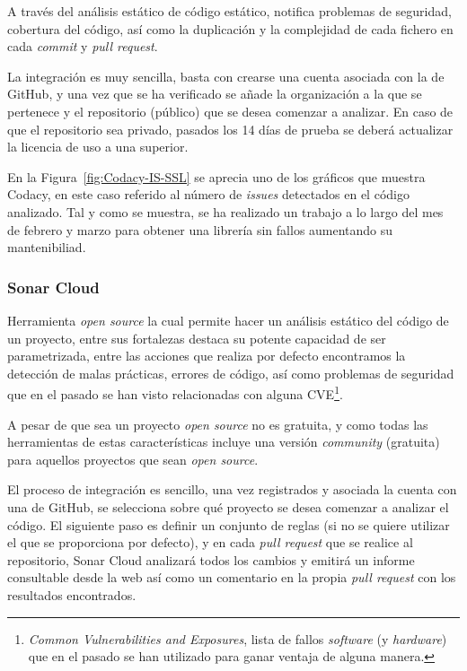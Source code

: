 A través del análisis estático de código estático, notifica problemas de seguridad, cobertura del código, así como la duplicación y la complejidad de cada fichero en cada \textit{commit} y \textit{pull request}.

La integración es muy sencilla, basta con crearse una cuenta asociada con la de GitHub, y una vez que se ha verificado se añade la organización a la que se pertenece y el repositorio (público) que se desea comenzar a analizar. En caso de que el repositorio sea privado, pasados los 14 días de prueba se deberá actualizar la licencia de uso a una superior.


En la Figura~\ref{fig:Codacy-IS-SSL} se aprecia uno de los gráficos que muestra Codacy, en este caso referido al número de \textit{issues} detectados en el código analizado. Tal y como se muestra, se ha realizado un trabajo a lo largo del mes de febrero y marzo para obtener una librería sin fallos aumentando su mantenibiliad.

\subsubsection{Sonar Cloud}

Herramienta \textit{open source} la cual permite hacer un análisis estático del código de un proyecto, entre sus fortalezas destaca su potente capacidad de ser parametrizada, entre las acciones que realiza por defecto encontramos la detección de malas prácticas, errores de código, así como problemas de seguridad que en el pasado se han visto relacionadas con alguna CVE\footnote{\textit{Common Vulnerabilities and Exposures}, lista de fallos \textit{software} (y \textit{hardware}) que en el pasado se han utilizado para ganar ventaja de alguna manera.}.

A pesar de que sea un proyecto \textit{open source} no es gratuita, y como todas las herramientas de estas características incluye una versión \textit{community} (gratuita) para aquellos proyectos que sean \textit{open source}.

El proceso de integración es sencillo, una vez registrados y asociada la cuenta con una de GitHub, se selecciona sobre qué proyecto se desea comenzar a analizar el código. El siguiente paso es definir un conjunto de reglas (si no se quiere utilizar el que se proporciona por defecto), y en cada \textit{pull request} que se realice al repositorio, Sonar Cloud analizará todos los cambios y emitirá un informe consultable desde la web así como un comentario en la propia \textit{pull request} con los resultados encontrados.

